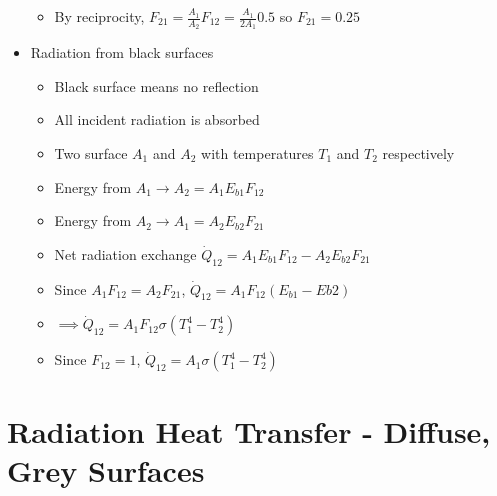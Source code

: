 \documentclass[12pt]{article}
\begin{document}
\begin{itemize}
\begin{itemize}
        \item By reciprocity, $F_{21} = \frac{A_1}{A_2} F_{12} = \frac{A_1}{2 A_1} 0.5$ so $F_{21} = 0.25$
    \end{itemize}
    \item Radiation from black surfaces \begin{itemize}
        \item Black surface means no reflection 
        \item All incident radiation is absorbed 
        \item Two surface $A_1$ and $A_2$ with temperatures $T_1$ and $T_2$ respectively 
        \item Energy from $A_1 \rightarrow A_2 = A_1 E_{b1} F_{12}$
        \item Energy from $A_2 \rightarrow A_1 = A_2 E_{b2} F_{21}$ 
        \item Net radiation exchange $\dot{Q}_{12} = A_1 E_{b1} F_{12} - A_2 E_{b2} F_{21}$ 
        \item Since $A_1 F_{12} = A_2 F_{21}$, $\dot{Q}_{12} = A_1 F_{12} (E_{b1} - E{b2})$
        \item $\implies \dot{Q}_{12} = A_1 F_{12} \sigma (T_1^4 - T_2^4)$
        \item Since $F_{12} = 1$, $\dot{Q}_{12} = A_1 \sigma (T_1^4 - T_2^4)$
    \end{itemize}
    
\end{itemize}

\section{Radiation Heat Transfer - Diffuse, Grey Surfaces} 
\end{document}
